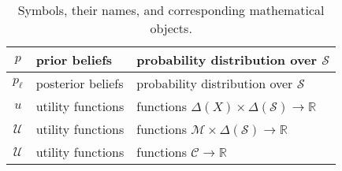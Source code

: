\begin{table}[H]
\begin{tabular}{ c l l }
		\( p \)                                            & prior beliefs               & probability distribution over \( \mathcal{S} \)                                               \\ \hline
		\(p_{\ell}\)                                       & posterior beliefs           & probability distribution over \( \mathcal{S} \)                                               \\ \hline
		\( u \)                                            & utility functions           & functions \(\Delta \left( X \right) \times \Delta \left( \mathcal{S} \right) \to \mathbb{R}\) \\ \hline
		\(\mathcal{U} \)                                   & utility functions           & functions \(\mathcal{M} \times \Delta \left( \mathcal{S} \right) \to \mathbb{R}\)             \\ \hline
		\(\mathscr{U} \)                                   & utility functions           & functions \(\mathcal{C} \to \mathbb{R}\)                                                      \\ \hline
	\end{tabular}
	\caption{Symbols, their names, and corresponding mathematical objects.}
\end{table}

